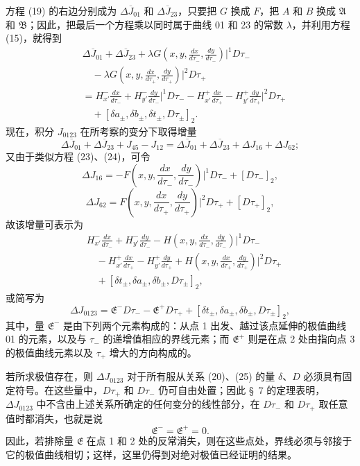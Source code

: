 \documentclass[11pt,a4paper,leqno]{article}
\begin{document}
方程 (19) 的右边分别成为 $\Delta\overline J_{01}$ 和 $\Delta\overline J_{23}$，只要把 $G$ 换成 $F$，把 $A$ 和 $B$ 换成 $\mathfrak A$ 和 $\mathfrak B$；因此，把最后一个方程乘以同时属于曲线 01 和 23 的常数 $\lambda$，并利用方程 (15)，就得到
\[
\begin{aligned}
&\Delta\overline J_{01}+\Delta\overline J_{23}
+\lambda G\left(x,y,\frac{dx}{d\tau_-},\frac{dy}{d\tau_-}\right)\bigg|^1D\tau_-\\
&\quad -\lambda G\left(x,y,\frac{dx}{d\tau_+},\frac{dy}{d\tau_+}\right)\bigg|^2D\tau_+\\
&=H_{x'}^-\frac{dx}{d\tau_-}+H_{y'}^-\frac{dy}{d\tau_-}\bigg|^1D\tau_-
-H_{x'}^+\frac{dx}{d\tau_+}-H_{y'}^+\frac{dy}{d\tau_+}\bigg|^2D\tau_+\\
&\quad +[\delta a_\pm,\delta b_\pm,\delta t_\pm,D\tau_\pm]_2.
\end{aligned}
\]
现在，积分 $J_{0123}$ 在所考察的变分下取得增量
\[
\Delta\overline J_{01}+\Delta\overline J_{23}+J_{45}-J_{12}
=\Delta\overline J_{01}+\Delta\overline J_{23}+\Delta J_{16}+\Delta J_{62};
\]
又由于类似方程 (23)、(24)，可令
\[
\Delta J_{16}=-F\left(x,y,\frac{dx}{d\tau_-},\frac{dy}{d\tau_-}\right)\bigg|^1D\tau_-+[D\tau_-]_2,
\]
\[
\Delta J_{62}=F\left(x,y,\frac{dx}{d\tau_+},\frac{dy}{d\tau_+}\right)\bigg|^2D\tau_+ +[D\tau_+]_2,
\]
故该增量可表示为
\[
\begin{aligned}
&H_{x'}^-\frac{dx}{d\tau_-}+H_{y'}^-\frac{dy}{d\tau_-}
-H\left(x,y,\frac{dx}{d\tau_-},\frac{dy}{d\tau_-}\right)\bigg|^1D\tau_-\\
&\quad -H_{x'}^+\frac{dx}{d\tau_+}-H_{y'}^+\frac{dy}{d\tau_+}
+H\left(x,y,\frac{dx}{d\tau_+},\frac{dy}{d\tau_+}\right)\bigg|^2D\tau_+\\
&\quad +[\delta t_\pm,\delta a_\pm,\delta b_\pm,D\tau_\pm]_2,
\end{aligned}
\]
或简写为
\[
\Delta J_{0123}=\mathfrak E^-D\tau_- -\mathfrak E^+D\tau_+ +[\delta t_\pm,\delta a_\pm,\delta b_\pm,D\tau_\pm]_2,
\]
其中，量 $\mathfrak E^-$ 是由下列两个元素构成的：从点 1 出发、越过该点延伸的极值曲线 01 的元素，以及与 $\tau_-$ 的递增值相应的界线元素；而 $\mathfrak E^+$ 则是在点 2 处由指向点 3 的极值曲线元素以及 $\tau_+$ 增大的方向构成的。

若所求极值存在，则 $\Delta J_{0123}$ 对于所有服从关系 (20)、(25) 的量 $\delta$、$D$ 必须具有固定符号。在这些量中，$D\tau_+$ 和 $D\tau_-$ 仍可自由处置；因此 \S~7 的定理表明，
$\Delta J_{0123}$ 中不含由上述关系所确定的任何变分的线性部分，在 $D\tau_-$ 和 $D\tau_+$ 取任意值时都消失，也就是说
\[
\mathfrak E^- = \mathfrak E^+=0.
\]
因此，若排除量 $\mathfrak E$ 在点 1 和 2 处的反常消失，则在这些点处，界线必须与邻接于它的极值曲线相切；这样，这里仍得到对绝对极值已经证明的结果。
\end{document}
